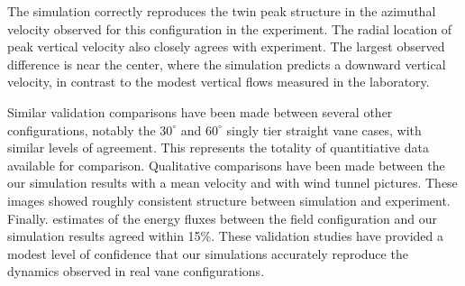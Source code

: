 The simulation correctly reproduces the twin peak structure in
the azimuthal velocity observed for this configuration in the
experiment. The radial location of peak vertical velocity also closely
agrees with experiment. The largest observed difference is near the
center, where the simulation predicts a downward vertical velocity, in
contrast to the modest vertical flows measured in the laboratory.  

Similar validation comparisons have been made between several other
configurations, notably the $30^{\circ}$ and $60^{\circ}$ singly tier
straight vane cases, with similar levels of agreement. This represents
the totality of quantitiative data available for comparison. Qualitative
comparisons have been made between the our simulation results with a
mean velocity and with wind tunnel pictures. These images showed roughly
consistent structure between simulation and
experiment. Finally. estimates of the energy fluxes between the field
configuration and our simulation results agreed within 15\%. These
validation studies have provided a modest level of confidence that our
simulations accurately reproduce the dynamics observed in real vane
configurations. 

%
% 
%
% 
%
%
%
%
